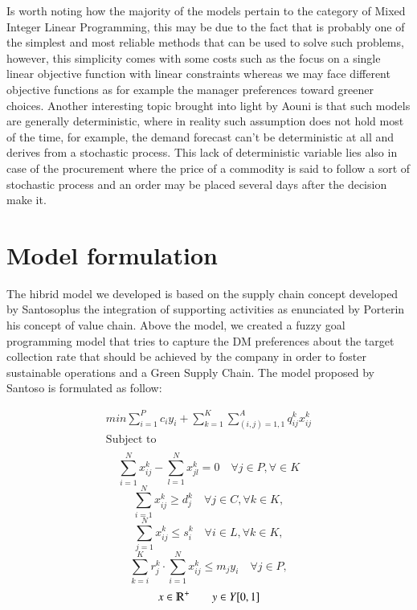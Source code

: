 \documentclass{article}
\begin{document}
  Is worth noting how the majority of the models pertain to the category of Mixed Integer Linear Programming, this may be due to the fact that is probably one of the simplest and most reliable methods that can be used to solve such problems, however, this simplicity comes with some costs such as the focus on a single linear objective function with linear constraints whereas we may face different objective functions as for example the manager preferences toward greener choices. Another interesting topic brought into light by Aouni \cite{azimian_supply_2017} is that such models are generally deterministic, where in reality such assumption does not hold most of the time, for example, the demand forecast can't be deterministic at all and derives from a stochastic process. This lack of deterministic variable lies also in case of the procurement where the price of a commodity is said to follow a sort of stochastic process and an order may be placed several days after the decision make it.


\section{Model formulation}
The hibrid model we developed is based on the supply chain concept developed by Santoso\cite{Santoso_Ahmed_Goetschalckx_Shapiro_2005}plus the integration of supporting activities as enunciated by Porter\cite{CompetitiveAdvantage}in his concept of value chain. Above the model, we created a fuzzy goal programming model that tries to capture the  DM preferences about the target collection rate that should be achieved by the company in order to foster sustainable operations and a Green Supply Chain.
The model proposed by Santoso is formulated as follow:

\begin{equation*}
\begin{aligned}
	min \sum_{i=1}^{P} c_i y_i  + \sum_{k=1}^{K} \sum_{(i,j)=1,1}^{A} q_{ij}^{k}x_{ij}^{k}
  \\
  \text{Subject to}
  \\
\end{aligned}
\end{equation*}
\begin{equation}
  \sum_{i=1}^{N} x_{ij}^k - \sum_{l=1}^{N} x_{jl}^k = 0 \quad \forall j \in P, \forall \in K
\end{equation}
\begin{equation}
  \sum_{i=1}^{N} x_{ij}^k \geq d_{j}^k \quad \forall j \in C, \forall k \in K,
\end{equation}
\begin{equation}
  \sum_{j=1}^{N} x_{ij}^{k} \leq s_{i}^{k}  \quad \forall i \in L, \forall k \in K,
\end{equation}
\begin{equation}
\sum_{k=i}^{K} r_{j}^k \cdot \sum_{i=1}^{N}x_{ij}^k \leq m_j y_i \quad \forall j \in P,
\end{equation}
\begin{equation}
  x \in \varmathbb{R}^+ \quad \quad 
  y \in Y[0,1] 
\end{equation}
\end{document}
